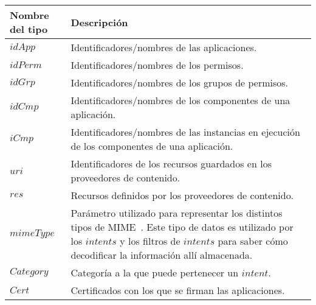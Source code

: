 
\begin{table}[thb!]
    \centering
    \begin{tabularx}{\linewidth}{|l X|}
        \hline
        \textbf{Nombre del tipo} & \textbf{Descripción}                                                                                                  \\
        \hline
        $idApp$                  & Identificadores/nombres de las aplicaciones.                                                                          \\
        \hline
        $idPerm$                 & Identificadores/nombres de los permisos.                                                                              \\
        \hline
        $idGrp$                  & Identificadores/nombres de los grupos de permisos.                                                                    \\
        \hline
        $idCmp$                  & Identificadores/nombres de los componentes de una aplicación.                                                         \\
        \hline
        $iCmp$                   & Identificadores/nombres de las instancias en ejecución de los componentes de una aplicación.                          \\
        \hline
        $uri$                    & Identificadores de los recursos guardados en los proveedores de contenido.                                            \\
        \hline
        $res$                    & Recursos definidos por los proveedores de contenido.                                                                  \\
        \hline
        $mimeType$               & Parámetro utilizado para representar los distintos tipos de
        MIME~\cite{mime-types}. Este tipo de datos es utilizado por los $intents$ y los filtros de
        $intents$ para saber cómo decodificar la información allí almacenada.                                                                            \\
        \hline
        $Category$               & Categoría a la que puede pertenecer un $intent$.                                                                      \\
        \hline
        $Cert$                   & Certificados con los que se firman las aplicaciones.                                                                  \\

\end{tabularx}
\end{table}
